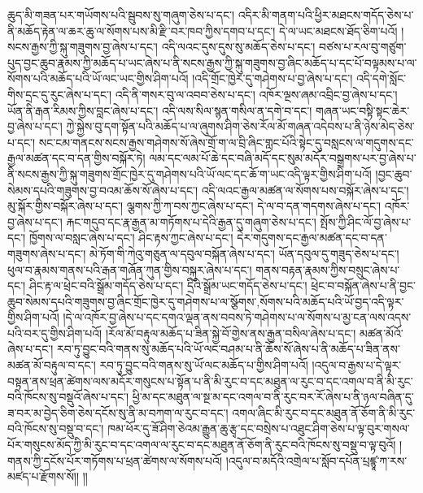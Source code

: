 ཆུད་མི་གཟན་པར་གཡོགས་པའི་སྦུབས་སུ་གཞུག་ཅེས་པ་དང་། འདིར་མི་གནག་པའི་ཕྱིར་མཐངས་གདོད་ཅེས་པ་ནི་མཆོད་རྟེན་ལ་ཆར་ཆུ་ལ་སོགས་པས་མི་རྫི་བར་ཁབ་ཀྱིས་དགབ་པ་དང་། དེ་ལ་ཡང་མཐངས་ཐོད་ཅིག་པའོ། །སངས་རྒྱས་ཀྱི་སྐུ་གཟུགས་བྱ་ཞེས་པ་དང་། འདི་ལའང་དུས་དུས་སུ་མཆོད་ཅེས་པ་དང་། བཙས་པ་རལ་བུ་གཙུག་པུད་བྱང་ཆུབ་རྣམས་ཀྱི་མཆོད་པ་ཡང་ཞེས་པ་ནི་སངས་རྒྱས་ཀྱི་སྐུ་གཟུགས་བྱ་ཞིང་མཆོད་པ་དང་པོ་བལྟམས་པ་ལ་སོགས་པའི་མཆོད་པའི་ཡོ་ལང་ཡང་གྱིས་ཤིག་པའོ། །འདི་གྲོང་ཁྱེར་དུ་གཤེགས་པ་བྱ་ཞེས་པ་དང་། འདི་དགེ་སློང་གིས་དྲང་དུ་རུང་ཞེས་པ་དང་། འདི་ནི་གསར་བུ་ལ་འབབ་ཅེས་པ་དང་། འཁོར་ལྔས་ཞམ་འབྲིང་བྱ་ཞེས་པ་དང་། ཡོན་ནི་རྒན་རིམས་ཀྱིས་བླང་ཞེས་པ་དང་། འདི་ལས་སིལ་སྙན་གསིལ་ན་དགེ་བ་དང་། གཞན་ཡང་བསྟི་སྟང་ཆེར་བྱ་ཞེས་པ་དང་། ཀྱེ་སྐྱེས་བུ་དག་སྟོན་པའི་མཆོད་པ་ལ་ཞུགས་ཤིག་ཅེས་རོལ་མོ་གཞན་འདེབས་པ་ནི་ཉེས་མེད་ཅེས་པ་དང་། སང་ངམ་གནངས་སངས་རྒྱས་གཤེགས་སོ་ཞེས་གྲོ་ག་ལ་བྲི་ཞིང་གླང་པོའི་སྟེང་དུ་བསླངས་ལ་གདུགས་དང་རྒྱལ་མཚན་དང་བ་དན་གྱིས་བསྐོར་ཏེ། ལམ་དང་ལམ་པོ་ཆེ་དང་བཞི་མདོ་དང་སུམ་མདོར་བསྒྲགས་པར་བྱ་ཞེས་པ་ནི་སངས་རྒྱས་ཀྱི་སྐུ་གཟུགས་གྲོང་ཁྱེར་དུ་གཤེགས་པའི་ཡོ་ལང་དང་ཆོ་ག་ཡང་འདི་ལྟར་གྱིས་ཤིག་པའོ། །བྱང་ཆུབ་སེམས་དཔའི་གཟུགས་བྱ་བའམ་ཆོས་སོ་ཞེས་པ་དང་། འདི་ལའང་རྒྱལ་མཚན་ལ་སོགས་པས་བསྐོར་ཞེས་པ་དང་། མུ་སྐོར་གྱིས་བསྐོར་ཞེས་པ་དང་། ལྕགས་ཀྱི་ཀ་བས་ཀྱང་ཞེས་པ་དང་། དེ་ལ་བ་དན་གདགས་ཞེས་པ་དང་། འཁོར་བྱ་ཞེས་པ་དང་། རྐང་གདུབ་དང་རྣ་རྒྱན་མ་གཏོགས་པ་དེའི་རྒྱན་དུ་གཞུག་ཅེས་པ་དང་། སྤོས་ཀྱི་ཤིང་ལོ་བྱ་ཞེས་པ་དང་། ཁྱོགས་ལ་བསླང་ཞེས་པ་དང་། ཤིང་རྟས་ཀྱང་ཞེས་པ་དང་། དེར་གདུགས་དང་རྒྱལ་མཚན་དང་བ་དན་གཟུགས་ཞེས་པ་དང་། མེ་ཏོག་གི་ཀེའུ་གཅུན་ལ་དབུལ་བསྐོན་ཞེས་པ་དང་། ཡོན་དབུལ་དུ་གཟུད་ཅེས་པ་དང་། ཕུལ་བ་རྣམས་གནས་པའི་རྒན་གཞོན་ཀུན་གྱིས་བསྐུར་ཞེས་པ་དང་། གནས་བརྟན་རྣམས་ཀྱིས་བསྲུང་ཞེས་པ་དང་། ཤིང་རྟ་ལ་ཕྲེང་བའི་སྒྲོམ་གདོད་ཅེས་པ་དང་། དྲིའི་སྒྲོམ་ཡང་གདོད་ཅེས་པ་དང་། ཕྲེང་བ་བསྐོན་ཞེས་པ་ནི་བྱང་ཆུབ་སེམས་དཔའི་གཟུགས་བྱ་ཞིང་གྲོང་ཁྱེར་དུ་གཤེགས་པ་ལ་{སྩོགས་,སོགས་}པའི་མཆོད་པའི་ཡོ་བྱད་འདི་ལྟར་གྱིས་ཤིག་པའོ། །དེ་ལ་འཁོར་བྱ་ཞེས་པ་དང་དགའ་ལྡན་ནས་བབས་ཏེ་གཤེགས་པ་ལ་སོགས་པ་མྱ་ངན་ལས་འདས་པའི་བར་དུ་གྱིས་ཤིག་པའོ། །རོལ་མོ་བརྟུལ་མཆོད་པ་ཟིན་སྐྱེ་བོ་གྱེས་ནས་རྒྱན་བསིལ་ཞེས་པ་དང་། མཚན་མོའོ་ཞེས་པ་དང་། རབ་ཏུ་བྱུང་བའི་གནས་སུ་མཆོད་པའི་ཡོ་ལང་བཤམ་པ་ནི་ཆོས་སོ་ཞེས་པ་ནི་མཆོད་པ་ཟིན་ནས་མཚན་མོ་བརྟུལ་བ་དང་། རབ་ཏུ་བྱུང་བའི་གནས་སུ་ཡོ་ལང་མཆོད་པ་གྱིས་ཤིག་པའོ། །འདུལ་བ་རྒྱས་པ་དེ་ལྟར་བསྟན་ནས་ཕྲན་ཚེགས་ལས་མདོར་གསུངས་པ་སྟོན་པ་ནི་མི་རུང་བ་དང་མཐུན་ལ་རུང་བ་དང་འགལ་བ་ནི་མི་རུང་བའི་ཁོངས་སུ་བསྡུའོ་ཞེས་པ་དང་། ཕྱི་མ་དང་མཐུན་ལ་སྔ་མ་དང་འགལ་བ་ནི་རུང་བར་རོ་ཞེས་པ་ནི་ཉལ་བཞིན་དུ་ཟ་བར་མ་བྱེད་ཅིག་ཅེས་དངོས་སུ་ནི་མ་བཀག་ལ་རུང་བ་དང་། འགལ་ཞིང་མི་རུང་བ་དང་མཐུན་ནོ་ཅོག་ནི་མི་རུང་བའི་ཁོངས་སུ་བསྡུ་བ་དང་། ཁམ་ཕོར་དུ་ཟོ་ཤིག་ཅེའམ་རྒྱུན་ཆུ་རྩྭ་དང་བསྲེས་པ་འཐུང་ཤིག་ཅེས་པ་ལྟ་བུར་གསལ་པོར་གསུངས་མོད་ཀྱི་མི་རུང་བ་དང་འགལ་ལ་རུང་བ་དང་མཐུན་ནོ་ཅོག་ནི་རུང་བའི་ཁོངས་སུ་བསྡུ་བ་ལྟ་བུའོ། །གནས་ཀྱི་དངོས་པོར་གཏོགས་པ་ཕྲན་ཚེགས་ལ་སོགས་པའོ། །འདུལ་བ་མདོའི་འགྲེལ་པ་སློབ་དཔོན་པྲཛྙཱ་ཀ་རས་མཛད་པ་རྫོགས་སོ།། །།